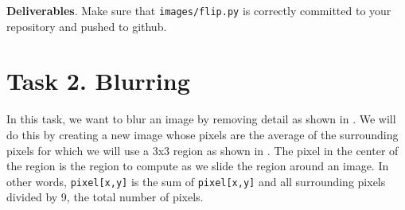 \begin{callout}{\bcplume}
{\bf Deliverables}. Make sure that {\tt images/flip.py} is correctly committed to your repository and pushed to github. 
\end{callout}

\section{Task 2. Blurring}

In this task, we want to blur an image by removing detail as shown in . We will do this by creating a new image whose pixels are the average of the surrounding pixels for which we will use a 3x3 region as shown in . The pixel in the center of the region is the region to compute as we slide the region around an image. In other words, {\tt pixel[x,y]} is the sum of {\tt pixel[x,y]} and all surrounding pixels divided by 9, the total number of pixels.

\begin{marginfigure}
\begin{center}
\\
\end{center}
\label{blur}
\end{marginfigure}

